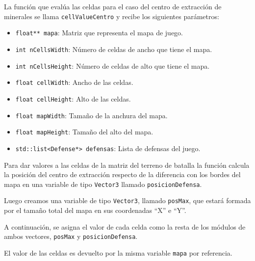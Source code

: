 

La función que evalúa las celdas para el caso del centro de extracción de minerales se llama \texttt{cellValueCentro} y recibe los siguientes parámetros:
\begin{itemize}
	\item \texttt{float** mapa}: Matriz que representa el mapa de juego.
	\item \texttt{int nCellsWidth}: Número de celdas de ancho que tiene el mapa.
	\item \texttt{int nCellsHeight}: Número de celdas de alto que tiene el mapa.
	\item \texttt{float cellWidth}: Ancho de las celdas.
	\item \texttt{float cellHeight}: Alto de las celdas.
	\item \texttt{float mapWidth}: Tamaño de la anchura del mapa.
	\item \texttt{float mapHeight}: Tamaño del alto del mapa.
	\item \texttt{std::list<Defense*> defensas}: Lista de defensas del juego.
\end{itemize}
Para dar valores a las celdas de la matriz del terreno de batalla la función calcula la posición del centro de extracción respecto de la diferencia con los bordes del mapa en una variable de tipo \texttt{Vector3} llamado \texttt{posicionDefensa}.

Luego creamos una variable de tipo \texttt{Vector3}, llamado \texttt{posMax}, que estará formada por el tamaño total del mapa en sus coordenadas ``X'' e ``Y''.
                                                                          
A continuación, se asigna el valor de cada celda como la resta de los módulos de ambos vectores, \texttt{posMax} y \texttt{posicionDefensa}.

El valor de las celdas es devuelto por la misma variable \texttt{mapa} por referencia.